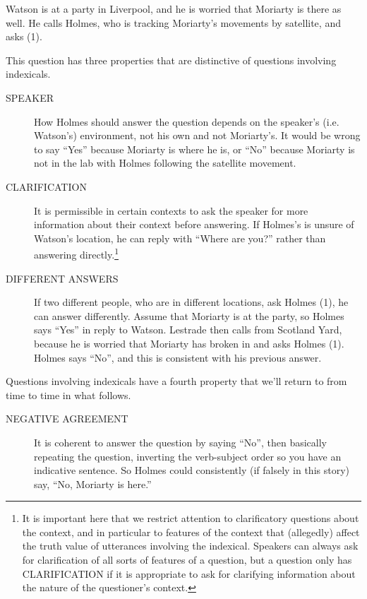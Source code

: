 Watson is at a party in Liverpool, and he is worried that Moriarty is there as well. He calls Holmes, who is tracking Moriarty's movements by satellite, and asks (1).


\noindent This question has three properties that are distinctive of questions involving indexicals.

\begin{description}
\item [SPEAKER] How Holmes should answer the question depends on the speaker's (i.e. Watson's) environment, not his own and not Moriarty's. It would be wrong to say ``Yes'' because Moriarty is where he is, or ``No'' because Moriarty is not in the lab with Holmes following the satellite movement.
\item [CLARIFICATION] It is permissible in certain contexts to ask the speaker for more information about their context before answering. If Holmes's is unsure of Watson's location, he can reply with ``Where are you?'' rather than answering directly.\footnote{It is important here that we restrict attention to clarificatory questions about the context, and in particular to features of the context that (allegedly) affect the truth value of utterances involving the indexical. Speakers can always ask for clarification of all sorts of features of a question, but a question only has CLARIFICATION if it is appropriate to ask for clarifying information about the nature of the questioner's context. }
\item [DIFFERENT ANSWERS] If two different people, who are in different locations, ask Holmes (1), he can answer differently. Assume that Moriarty is at the party, so Holmes says ``Yes'' in reply to Watson. Lestrade then calls from Scotland Yard, because he is worried that Moriarty has broken in and asks Holmes (1). Holmes says ``No'', and this is consistent with his previous answer.
\end{description}

\noindent Questions involving indexicals have a fourth property that we'll return to from time to time in what follows.

\begin{description}
\item [NEGATIVE AGREEMENT] It is coherent to answer the question by saying ``No'', then basically repeating the question, inverting the verb-subject order so you have an indicative sentence. So Holmes could consistently (if falsely in this story) say, ``No, Moriarty is here.''
\end{description}

